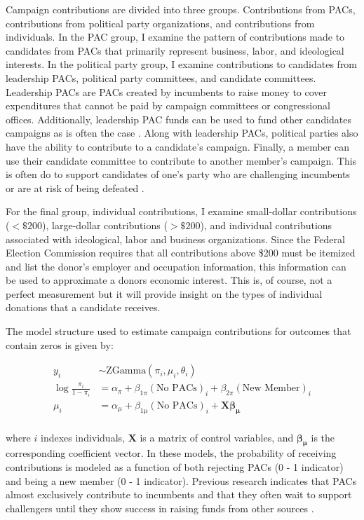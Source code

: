 \documentclass[12pt]{article}
\begin{document}
Campaign contributions are divided into three groups. Contributions from PACs, contributions from political party organizations, and contributions from individuals. In the PAC group, I examine the pattern of contributions made to candidates from PACs that primarily represent business, labor, and ideological interests. In the political party group, I examine contributions to candidates from leadership PACs, political party committees, and candidate committees. Leadership PACs are PACs created by incumbents to raise money to cover expenditures that cannot be paid by campaign committees or congressional offices. Additionally, leadership PAC funds can be used to fund other candidates campaigns as is often the case \citep{lazer_leadership_2015}. Along with leadership PACs, political parties also have the ability to contribute to a candidate's campaign. Finally, a member can use their candidate committee to contribute to another member's campaign. This is often do to support candidates of one's party who are challenging incumbents or are at risk of being defeated \citep{lazer_candidate_2015}. 

For the final group, individual contributions, I examine small-dollar contributions ($< \$200$), large-dollar contributions ($> \$200$), and individual contributions associated with ideological, labor and business organizations. Since the Federal Election Commission requires that all contributions above \$200 must be itemized and list the donor's employer and occupation information, this information can be used to approximate a donors economic interest. This is, of course, not a perfect measurement but it will provide insight on the types of individual donations that a candidate receives. 

The model structure used to estimate campaign contributions for outcomes that contain zeros is given by: 

$$
\begin{aligned}
	y_i &\sim \text{ZGamma}(\pi_i, \mu_i, \theta_i) \\
	\log \frac{\pi_i}{1 - \pi_i} &= \alpha_{\pi} + \beta_{1\pi} (\text{No PACs})_i + \beta_{2\pi} (\text{New Member})_i \\
	\mu_i &= \alpha_{\mu} + \beta_{1\mu} (\text{No PACs})_i + \bm{X} \bm{\beta_{\mu}} \\
\end{aligned}
$$

\noindent where $i$ indexes individuals, $\bm{X}$ is a matrix of control variables, and $\bm{\beta_{\mu}}$ is the corresponding coefficient vector. In these models, the probability of receiving contributions is modeled as a function of both rejecting PACs (0 - 1 indicator) and being a new member (0 - 1 indicator). Previous research indicates that PACs almost exclusively contribute to incumbents \citep{brunell_relationship_2005} and that they often wait to support challengers until they show success in raising funds from other sources \citep{biersack_seeds_1993}. 
\end{document}
